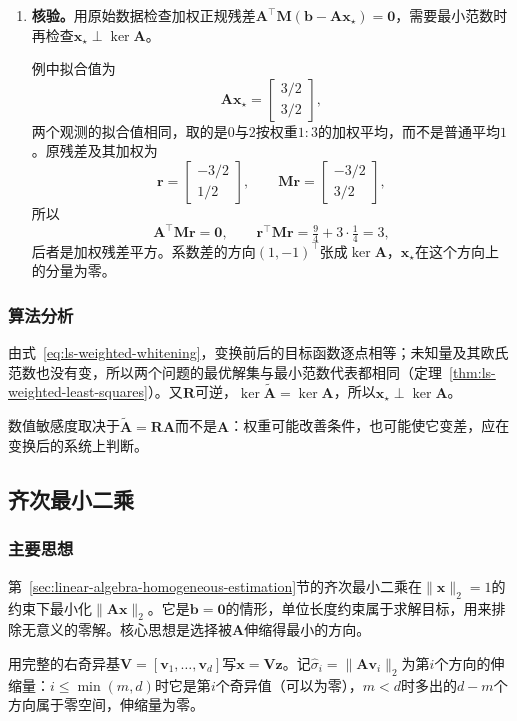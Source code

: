 \begin{enumerate}
 \item \textbf{核验。}用原始数据检查加权正规残差$\bm A^\top\bm M(\bm b-\bm A\bm x_\star)=\bm0$，需要最小范数时再检查$\bm x_\star\perp\ker\bm A$。

 例中拟合值为
 \[
  \bm A\bm x_\star=\begin{bmatrix}3/2\\3/2\end{bmatrix},
 \]
 两个观测的拟合值相同，取的是$0$与$2$按权重$1:3$的加权平均，而不是普通平均$1$。原残差及其加权为
 \[
  \bm r=\begin{bmatrix}-3/2\\1/2\end{bmatrix},\qquad
  \bm M\bm r=\begin{bmatrix}-3/2\\3/2\end{bmatrix},
 \]
 所以
 \[
  \bm A^\top\bm M\bm r=\bm0,\qquad
  \bm r^\top\bm M\bm r=\tfrac94+3\cdot\tfrac14=3 ,
 \]
 后者是加权残差平方。系数差的方向$(1,-1)^\top$张成$\ker\bm A$，$\bm x_\star$在这个方向上的分量为零。
\end{enumerate}

\subsubsection{算法分析}
由式~\eqref{eq:ls-weighted-whitening}，变换前后的目标函数逐点相等；未知量及其欧氏范数也没有变，所以两个问题的最优解集与最小范数代表都相同（定理~\ref{thm:ls-weighted-least-squares}）。又$\bm R$可逆，$\ker\widetilde{\bm A}=\ker\bm A$，所以$\bm x_\star\perp\ker\bm A$。

数值敏感度取决于$\widetilde{\bm A}=\bm R\bm A$而不是$\bm A$：权重可能改善条件，也可能使它变差，应在变换后的系统上判断。

\subsection{齐次最小二乘}
\label{sec:ls-homogeneous-svd-solve}

\subsubsection{主要思想}
第~\ref{sec:linear-algebra-homogeneous-estimation}节的齐次最小二乘在$\lVert\bm x\rVert_2=1$的约束下最小化$\lVert\bm A\bm x\rVert_2$。它是$\bm b=\bm0$的情形，单位长度约束属于求解目标，用来排除无意义的零解。核心思想是选择被$\bm A$伸缩得最小的方向。

用完整的右奇异基$\bm V=[\bm v_1,\ldots,\bm v_d]$写$\bm x=\bm V\bm z$。记$\hat\sigma_i=\lVert\bm A\bm v_i\rVert_2$为第$i$个方向的伸缩量：$i\leq\min(m,d)$时它是第$i$个奇异值（可以为零），$m<d$时多出的$d-m$个方向属于零空间，伸缩量为零。

